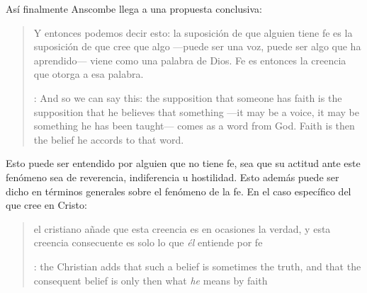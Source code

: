 Así finalmente Anscombe llega a una propuesta conclusiva: \blockquote[{\cite[119--120]{anscombe1981erp:faith}}: And so we can say this: the supposition that someone has faith is the supposition that he believes that something ---it may be a voice, it may be something he has been taught--- comes as a word from God. Faith is then the belief he accords to that word.]{Y entonces podemos decir esto: la suposición de que alguien tiene fe es la suposición de que cree que algo ---puede ser una voz, puede ser algo que ha aprendido--- viene como una palabra de Dios. Fe es entonces la creencia que otorga a esa palabra.} Esto puede ser entendido por alguien que no tiene fe, sea que su actitud ante este fenómeno sea de reverencia, indiferencia u hostilidad. Esto además puede ser dicho en términos generales sobre el fenómeno de la fe. En el caso específico del que cree en Cristo: \blockquote[{\cite[120]{anscombe1981erp:faith}}: the Christian adds that such a belief is sometimes the truth, and that the consequent belief is only then what \emph{he} means by faith]{el cristiano añade que esta creencia es en ocasiones la verdad, y esta creencia consecuente es solo lo que \emph{él} entiende por fe}.
